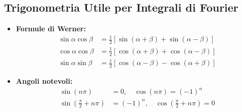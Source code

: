 \documentclass[a4paper, 12pt]{article}
\begin{document}
\subsection{Trigonometria Utile per Integrali di Fourier}
\begin{itemize}
    \item \textbf{Formule di Werner:}
    \begin{align*}
        \sin \alpha \cos \beta &= \frac{1}{2}[\sin(\alpha+\beta) + \sin(\alpha-\beta)] \\
        \cos \alpha \cos \beta &= \frac{1}{2}[\cos(\alpha+\beta) + \cos(\alpha-\beta)] \\
        \sin \alpha \sin \beta &= \frac{1}{2}[\cos(\alpha-\beta) - \cos(\alpha+\beta)]
    \end{align*}
    \item \textbf{Angoli notevoli:}
    \begin{align*}
        \sin(n\pi) &= 0, \quad \cos(n\pi) = (-1)^n \\
        \sin\left(\frac{\pi}{2}+n\pi\right) &= (-1)^n, \quad \cos\left(\frac{\pi}{2}+n\pi\right) = 0
    \end{align*}
\end{itemize}

\vfill
\end{document}
